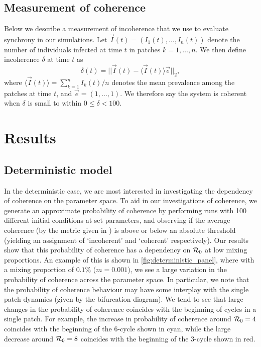 \documentclass[12pt]{article}
\newcommand{\R}{{\cal R}}
\begin{document}
\subsection{Measurement of coherence}
\label{ss:measurement}
Below we describe a measurement of incoherence that we use to evaluate synchrony in our simulations. 
Let $\vec{I} (t) = (I_1(t), \dots, I_n(t))$ denote the number of individuals infected at time $t$ in patches $k = 1, \dots, n$. We then define incoherence $\delta$ at time $t$ as
$$
\delta(t) = || \vec{I}(t) - \langle \vec{I} (t) \rangle \vec{e}||_2,
$$
where $\langle \vec{I} (t) \rangle = \sum_{k=1}^n I_k(t) / n$ denotes the mean prevalence among the patches at time $t$, and $\vec{e} = (1, \dots, 1)$. We therefore say the system is coherent when $\delta$ is small to within $0 \leq \delta < 100$. 

\section{Results} \label{sec:numerical}
\subsection{Deterministic model} \label{ss:deterministic}
In the deterministic case, we are most interested in investigating the dependency of coherence on the parameter space. To aid in our investigations of coherence, we generate an approximate probability of coherence by performing runs with 100 different initial conditions at set parameters, and observing if the average coherence (by the metric given in ) is above or below an absolute threshold (yielding an assignment of `incoherent’ and `coherent’ respectively). Our results show that this probability of coherence has a dependency on $\R_0$ at low mixing proportions. An example of this is shown in \autoref{fig:deterministic_panel}, where with a mixing proportion of $0.1\%$ ($m = 0.001$), we see a large variation in the probability of coherence across the parameter space. In particular, we note that the probability of coherence behaviour may have some interplay with the single patch dynamics (given by the bifurcation diagram). We tend to see that large changes in the probability of coherence coincides with the beginning of cycles in a single patch. For example, the increase in probability of coherence around $\R_0=4$ coincides with the beginning of the 6-cycle shown in cyan, while the large decrease around $\R_0=8$ coincides with the beginning of the 3-cycle shown in red. 
\end{document}
